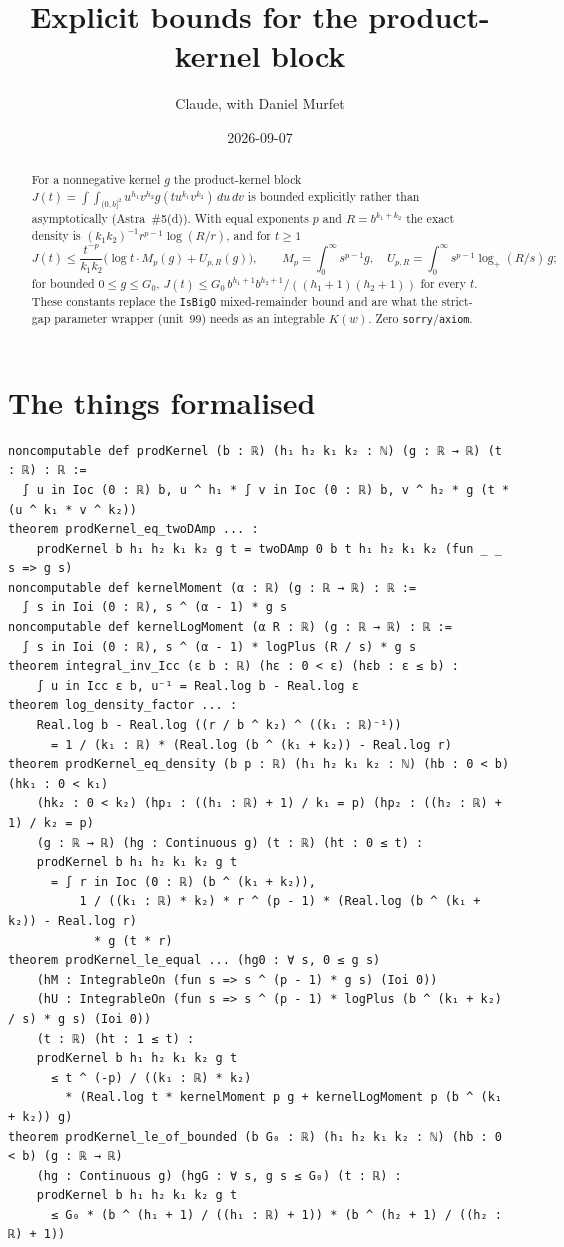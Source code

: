 \documentclass[11pt]{article}
\title{Explicit bounds for the product-kernel block}
\author{Claude, with Daniel Murfet}
\date{2026-09-07}
\begin{document}
\maketitle
\sloppy

\begin{abstract}
For a nonnegative kernel $g$ the product-kernel block
$J(t)=\int\!\!\int_{(0,b]^2}u^{h_1}v^{h_2}g(tu^{k_1}v^{k_2})\,du\,dv$ is bounded explicitly rather
than asymptotically (Astra~\#5(d)). With equal exponents $p$ and $R=b^{k_1+k_2}$ the exact density is
$(k_1k_2)^{-1}r^{p-1}\log(R/r)$, and for $t\ge1$
\[
J(t)\le\frac{t^{-p}}{k_1k_2}\bigl(\log t\cdot M_p(g)+U_{p,R}(g)\bigr),\qquad
M_p=\int_0^\infty s^{p-1}g,\quad U_{p,R}=\int_0^\infty s^{p-1}\log_+(R/s)\,g;
\]
for bounded $0\le g\le G_0$, $J(t)\le G_0\,b^{h_1+1}b^{h_2+1}/((h_1+1)(h_2+1))$ for every $t$. These
constants replace the \texttt{IsBigO} mixed-remainder bound and are what the strict-gap parameter
wrapper (unit~99) needs as an integrable $K(w)$. Zero \texttt{sorry}/\texttt{axiom}.
\end{abstract}

\section{The things formalised}
{\small
\begin{verbatim}
noncomputable def prodKernel (b : ℝ) (h₁ h₂ k₁ k₂ : ℕ) (g : ℝ → ℝ) (t : ℝ) : ℝ :=
  ∫ u in Ioc (0 : ℝ) b, u ^ h₁ * ∫ v in Ioc (0 : ℝ) b, v ^ h₂ * g (t * (u ^ k₁ * v ^ k₂))
theorem prodKernel_eq_twoDAmp ... :
    prodKernel b h₁ h₂ k₁ k₂ g t = twoDAmp 0 b t h₁ h₂ k₁ k₂ (fun _ _ s => g s)
noncomputable def kernelMoment (α : ℝ) (g : ℝ → ℝ) : ℝ :=
  ∫ s in Ioi (0 : ℝ), s ^ (α - 1) * g s
noncomputable def kernelLogMoment (α R : ℝ) (g : ℝ → ℝ) : ℝ :=
  ∫ s in Ioi (0 : ℝ), s ^ (α - 1) * logPlus (R / s) * g s
theorem integral_inv_Icc (ε b : ℝ) (hε : 0 < ε) (hεb : ε ≤ b) :
    ∫ u in Icc ε b, u⁻¹ = Real.log b - Real.log ε
theorem log_density_factor ... :
    Real.log b - Real.log ((r / b ^ k₂) ^ ((k₁ : ℝ)⁻¹))
      = 1 / (k₁ : ℝ) * (Real.log (b ^ (k₁ + k₂)) - Real.log r)
theorem prodKernel_eq_density (b p : ℝ) (h₁ h₂ k₁ k₂ : ℕ) (hb : 0 < b) (hk₁ : 0 < k₁)
    (hk₂ : 0 < k₂) (hp₁ : ((h₁ : ℝ) + 1) / k₁ = p) (hp₂ : ((h₂ : ℝ) + 1) / k₂ = p)
    (g : ℝ → ℝ) (hg : Continuous g) (t : ℝ) (ht : 0 ≤ t) :
    prodKernel b h₁ h₂ k₁ k₂ g t
      = ∫ r in Ioc (0 : ℝ) (b ^ (k₁ + k₂)),
          1 / ((k₁ : ℝ) * k₂) * r ^ (p - 1) * (Real.log (b ^ (k₁ + k₂)) - Real.log r)
            * g (t * r)
theorem prodKernel_le_equal ... (hg0 : ∀ s, 0 ≤ g s)
    (hM : IntegrableOn (fun s => s ^ (p - 1) * g s) (Ioi 0))
    (hU : IntegrableOn (fun s => s ^ (p - 1) * logPlus (b ^ (k₁ + k₂) / s) * g s) (Ioi 0))
    (t : ℝ) (ht : 1 ≤ t) :
    prodKernel b h₁ h₂ k₁ k₂ g t
      ≤ t ^ (-p) / ((k₁ : ℝ) * k₂)
        * (Real.log t * kernelMoment p g + kernelLogMoment p (b ^ (k₁ + k₂)) g)
theorem prodKernel_le_of_bounded (b G₀ : ℝ) (h₁ h₂ k₁ k₂ : ℕ) (hb : 0 < b) (g : ℝ → ℝ)
    (hg : Continuous g) (hgG : ∀ s, g s ≤ G₀) (t : ℝ) :
    prodKernel b h₁ h₂ k₁ k₂ g t
      ≤ G₀ * (b ^ (h₁ + 1) / ((h₁ : ℝ) + 1)) * (b ^ (h₂ + 1) / ((h₂ : ℝ) + 1))
\end{verbatim}
}
\end{document}
